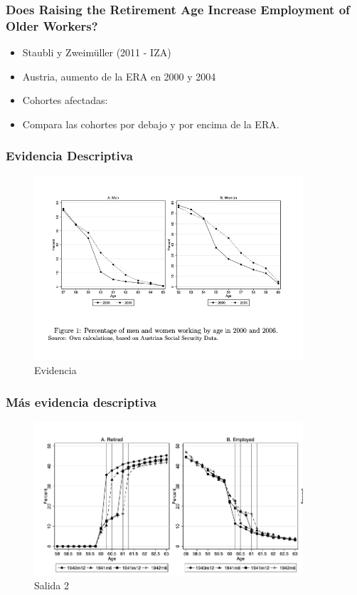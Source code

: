 \documentclass{beamer}
\begin{document}
  \frame
  {
    \frametitle{Does Raising the Retirement Age Increase Employment of Older Workers?}
    \begin{itemize}
    \item Staubli y Zweimüller (2011 - IZA)
    \item Austria, aumento de la ERA en 2000 y 2004
    \item Cohortes afectadas:
    \item Compara las cohortes por debajo y por encima de la ERA.
    \end{itemize}
  }
  \frame
  {
    \frametitle{Evidencia Descriptiva}
      \begin{figure}[htp]
        \centering
        \includegraphics[width=10cm]{imgs/staubli-fig1}
        \caption{Evidencia}
        \label{fig:fig2}
      \end{figure}
  }
  \frame
  {
    \frametitle{Más evidencia descriptiva}
      \begin{figure}[htp]
        \centering
        \includegraphics[width=10cm]{imgs/staubli-fig4}
        \caption{Salida 2}
        \label{fig:fig2}
      \end{figure}
  }
  \frame
\end{document}
